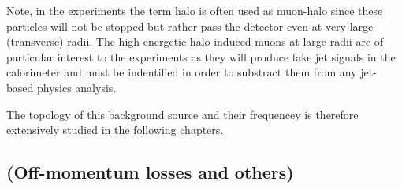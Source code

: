 Note, in the experiments the term halo is often used as muon-halo since these particles will not be stopped but rather pass the detector even at very large (transverse) radii. The high energetic halo induced muons at large radii are of particular interest to the experiments as they will produce fake jet signals in the calorimeter and must be indentified in order to substract them from any jet-based physics analysis. 

The topology of this background source and their frequencey is therefore extensively studied in the following chapters.

\subsection{(Off-momentum losses and others)}



